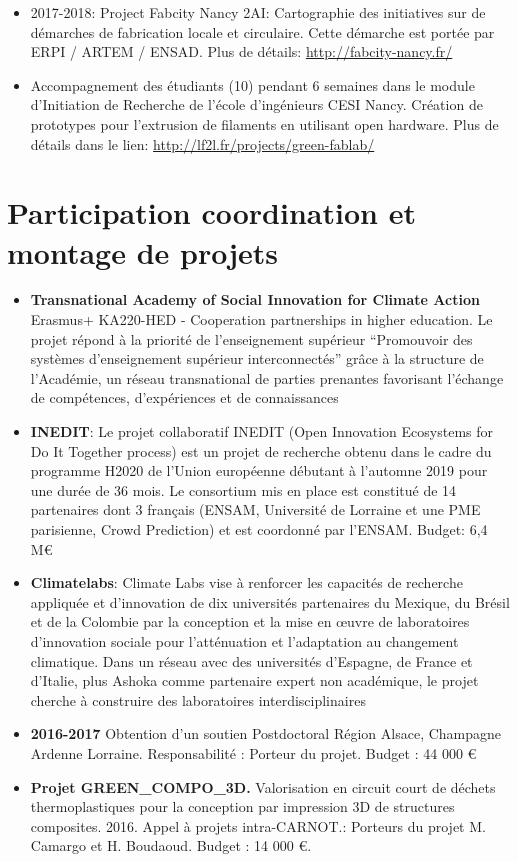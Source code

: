 \documentclass[
  12pt,
  oneside]{book}
\begin{document}
\begin{itemize}
\item
  2017-2018: Project Fabcity Nancy 2AI: Cartographie des initiatives sur de démarches de fabrication locale et circulaire. Cette démarche est portée par ERPI / ARTEM / ENSAD. Plus de détails: \url{http://fabcity-nancy.fr/}
\item
  Accompagnement des étudiants (10) pendant 6 semaines dans le module d'Initiation de Recherche de l'école d'ingénieurs CESI Nancy.
  Création de prototypes pour l'extrusion de filaments en utilisant open hardware.
  Plus de détails dans le lien: \url{http://lf2l.fr/projects/green-fablab/}
\end{itemize}

\hypertarget{participation-coordination-et-montage-de-projets}{%
\section{Participation coordination et montage de projets}\label{participation-coordination-et-montage-de-projets}}

\begin{itemize}
\item
  \textbf{Transnational Academy of Social Innovation for Climate Action} Erasmus+ KA220-HED - Cooperation partnerships in higher education. Le projet répond à la priorité de l'enseignement supérieur ``Promouvoir des systèmes d'enseignement supérieur interconnectés'' grâce à la structure de l'Académie, un réseau transnational de parties prenantes favorisant l'échange de compétences, d'expériences et de connaissances
\item
  \textbf{INEDIT}: Le projet collaboratif INEDIT (Open Innovation Ecosystems for Do It Together process) est un projet de recherche obtenu dans le cadre du programme H2020 de l'Union européenne débutant à l'automne 2019 pour une durée de 36 mois. Le consortium mis en place est constitué de 14 partenaires dont 3 français (ENSAM, Université de Lorraine et une PME parisienne, Crowd Prediction) et est coordonné par l'ENSAM. Budget: 6,4 M€
\item
  \textbf{Climatelabs}: Climate Labs vise à renforcer les capacités de recherche appliquée et d'innovation de dix universités partenaires du Mexique, du Brésil et de la Colombie par la conception et la mise en œuvre de laboratoires d'innovation sociale pour l'atténuation et l'adaptation au changement climatique. Dans un réseau avec des universités d'Espagne, de France et d'Italie, plus Ashoka comme partenaire expert non académique, le projet cherche à construire des laboratoires interdisciplinaires
\item
  \textbf{2016-2017} Obtention d'un soutien Postdoctoral Région Alsace, Champagne Ardenne Lorraine. Responsabilité : Porteur du projet. Budget : 44 000 €
\item
  \textbf{Projet GREEN\_COMPO\_3D.} Valorisation en circuit court de déchets thermoplastiques pour la conception par impression 3D de structures composites. 2016. Appel à projets intra-CARNOT.: Porteurs du projet M. Camargo et H. Boudaoud.
  Budget : 14 000 €.
\end{itemize}
\end{document}
